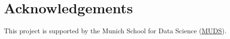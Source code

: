 \documentclass[10pt,a4paper]{article}
\let\cite\citep
\begin{document}
\section*{Acknowledgements}
This project is supported by the Munich School for Data Science (\href{https://www.mu-ds.de/}{MUDS}).


{\small
}





\end{document}

